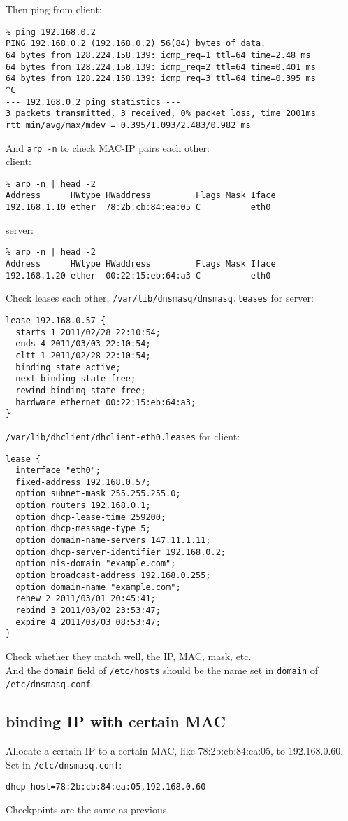 \documentclass[a4paper]{report}
\begin{document}
Then ping from client:
\begin{lstlisting}
% ping 192.168.0.2
PING 192.168.0.2 (192.168.0.2) 56(84) bytes of data.
64 bytes from 128.224.158.139: icmp_req=1 ttl=64 time=2.48 ms
64 bytes from 128.224.158.139: icmp_req=2 ttl=64 time=0.401 ms
64 bytes from 128.224.158.139: icmp_req=3 ttl=64 time=0.395 ms
^C
--- 192.168.0.2 ping statistics ---
3 packets transmitted, 3 received, 0% packet loss, time 2001ms
rtt min/avg/max/mdev = 0.395/1.093/2.483/0.982 ms
\end{lstlisting}
And {\tt arp -n} to check MAC-IP pairs each other:\\
client:
\begin{lstlisting}
% arp -n | head -2
Address      HWtype HWaddress         Flags Mask Iface
192.168.1.10 ether  78:2b:cb:84:ea:05 C          eth0
\end{lstlisting}
server:
\begin{lstlisting}
% arp -n | head -2
Address      HWtype HWaddress         Flags Mask Iface
192.168.1.20 ether  00:22:15:eb:64:a3 C          eth0
\end{lstlisting}
Check leases each other, {\tt /var/lib/dnsmasq/dnsmasq.leases} for server:
\begin{lstlisting}
lease 192.168.0.57 {
  starts 1 2011/02/28 22:10:54;
  ends 4 2011/03/03 22:10:54;
  cltt 1 2011/02/28 22:10:54;
  binding state active;
  next binding state free;
  rewind binding state free;
  hardware ethernet 00:22:15:eb:64:a3;
}
\end{lstlisting}
{\tt /var/lib/dhclient/dhclient-eth0.leases} for client:
\begin{lstlisting}
lease {
  interface "eth0";
  fixed-address 192.168.0.57;
  option subnet-mask 255.255.255.0;
  option routers 192.168.0.1;
  option dhcp-lease-time 259200;
  option dhcp-message-type 5;
  option domain-name-servers 147.11.1.11;
  option dhcp-server-identifier 192.168.0.2;
  option nis-domain "example.com";
  option broadcast-address 192.168.0.255;
  option domain-name "example.com";
  renew 2 2011/03/01 20:45:41;
  rebind 3 2011/03/02 23:53:47;
  expire 4 2011/03/03 08:53:47;
}
\end{lstlisting}
Check whether they match well, the IP, MAC, mask, etc.\\
And the {\tt domain} field of {\tt /etc/hosts} should be the name set in 
{\tt domain} of {\tt /etc/dnsmasq.conf}.
\subsection{binding IP with certain MAC}
Allocate a certain IP to a certain MAC, like 78:2b:cb:84:ea:05, to 192.168.0.60.
Set in {\tt /etc/dnsmasq.conf}:
\begin{lstlisting}
dhcp-host=78:2b:cb:84:ea:05,192.168.0.60
\end{lstlisting}
Checkpoints are the same as previous.
\end{document}
